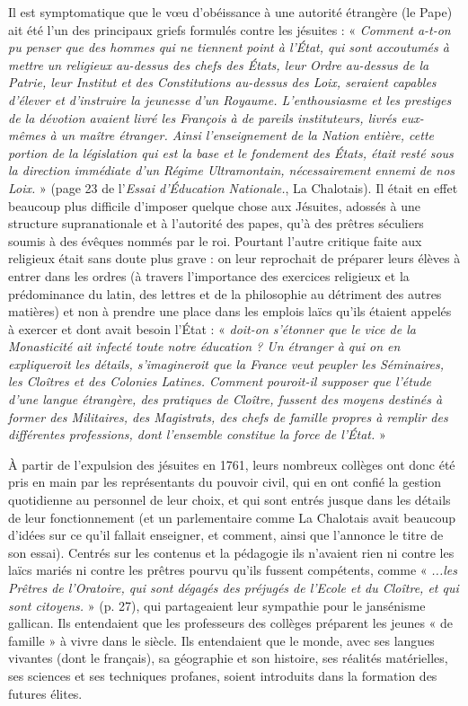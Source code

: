 Il est symptomatique que le vœu d'obéissance à une autorité étrangère (le Pape) ait été l'un des principaux griefs formulés contre les jésuites :
 « \emph{Comment a-t-on pu penser que des hommes qui ne tiennent point à l'État, qui sont accoutumés à mettre un religieux au-dessus des chefs des États, leur Ordre au-dessus de la Patrie, leur Institut et des Constitutions au-dessus des Loix, seraient capables d'élever et d'instruire la jeunesse d'un Royaume. L'enthousiasme et les prestiges de la dévotion avaient livré les François à de pareils instituteurs, livrés eux-mêmes à un maître étranger. Ainsi l'enseignement de la Nation entière, cette portion de la législation qui est la base et le fondement des États, était resté sous la direction immédiate d'un Régime Ultramontain, nécessairement ennemi de nos Loix.} » (page 23 de l'\emph{Essai d'Éducation Nationale.}, La Chalotais).  Il était en effet beaucoup plus difficile d'imposer quelque chose aux Jésuites, adossés à une structure supranationale et à l'autorité des papes, qu'à des prêtres séculiers soumis à des évêques nommés par le roi. Pourtant l'autre critique faite aux religieux était sans doute plus grave : on leur reprochait de préparer leurs élèves à entrer dans les ordres (à travers l'importance des exercices religieux et la prédominance du latin, des lettres et de la philosophie au détriment des autres matières) et non à prendre une place dans les emplois laïcs qu'ils étaient appelés à exercer et dont avait besoin l'État : « \emph{doit-on s'étonner que le vice de la Monasticité ait infecté toute notre éducation ? Un étranger à qui on en expliqueroit les détails, s'imagineroit que la France veut peupler les Séminaires, les Cloîtres et des Colonies Latines. Comment pouroit-il supposer que l'étude d'une langue étrangère, des pratiques de Cloître, fussent des moyens destinés à former des Militaires, des Magistrats, des chefs de famille propres à remplir des différentes professions, dont l'ensemble constitue la force de l'État.} »
 
 À partir de l'expulsion des jésuites en 1761, leurs nombreux collèges ont donc été pris en main par les représentants du pouvoir civil, qui en ont confié la gestion quotidienne au personnel de leur choix, et qui sont entrés jusque dans les détails de leur fonctionnement (et un parlementaire comme La Chalotais avait beaucoup d'idées sur ce qu'il fallait enseigner, et comment, ainsi que l'annonce le titre de son essai). Centrés sur les contenus et la pédagogie ils n'avaient rien ni contre les laïcs mariés ni contre les prêtres pourvu qu'ils fussent compétents, comme « \emph{...les Prêtres de l'Oratoire, qui sont dégagés des préjugés de l'Ecole et du Cloître, et qui sont citoyens.} » (p. 27), qui partageaient leur sympathie pour le jansénisme gallican. Ils entendaient que les professeurs des collèges préparent les jeunes « de famille » à vivre dans le siècle. Ils entendaient que le monde, avec ses langues vivantes (dont le français), sa géographie et son histoire, ses réalités matérielles, ses sciences et ses techniques profanes, soient introduits dans la formation des futures élites. 
 
